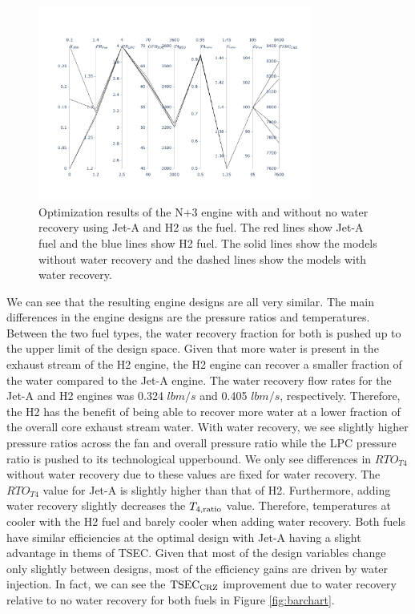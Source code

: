 \documentclass[conf]{new-aiaa}
\begin{document}
\begin{figure}[hbt!]
    \centering
    \includegraphics[width=0.8\textwidth]{N3_parallel_coords.pdf}
    \caption{Optimization results of the N+3 engine with and without no water recovery using Jet-A and H2 as the fuel.
        The red lines show Jet-A fuel and the blue lines show H2 fuel.
        The solid lines show the models without water recovery and the dashed lines show the models with water recovery.}
    \label{fig:parallel_coords}
\end{figure}

We can see that the resulting engine designs are all very similar.
The main differences in the engine designs are the pressure ratios and temperatures.
Between the two fuel types, the water recovery fraction for both is pushed up to the upper limit of the design space.
Given that more water is present in the exhaust stream of the H2 engine, the H2 engine can recover a smaller fraction of the water compared to the Jet-A engine.
The water recovery flow rates for the Jet-A and H2 engines was 0.324 $\si{lbm/s}$ and 0.405 $\si{lbm/s}$, respectively.
Therefore, the H2 has the benefit of being able to recover more water at a lower fraction of the overall core exhaust stream water.
With water recovery, we see slightly higher pressure ratios across the fan and overall pressure ratio while the LPC pressure ratio is pushed to its technological upperbound.
We only see differences in $RTO_{T4}$ without water recovery due to these values are fixed for water recovery.
The $RTO_{T4}$ value for Jet-A is slightly higher than that of H2.
Furthermore, adding water recovery slightly decreases the $T_{4,\rm{ratio}}$ value.
Therefore, temperatures at cooler with the H2 fuel and barely cooler when adding water recovery.
Both fuels have similar efficiencies at the optimal design with Jet-A having a slight advantage in thems of TSEC.
Given that most of the design variables change only slightly between designs, most of the efficiency gains are driven by water injection.
In fact, we can see the $\rm{TSEC}_{\rm{CRZ}}$ improvement due to water recovery relative to no water recovery for both fuels in Figure \ref{fig:barchart}.
\end{document}
